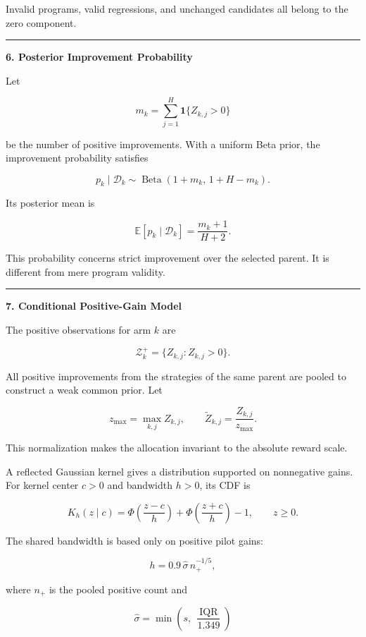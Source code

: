 \documentclass[
]{article}
\begin{document}
Invalid programs, valid regressions, and unchanged candidates all belong
to the zero component.

\begin{center}\rule{0.5\linewidth}{0.5pt}\end{center}

\textbf{6. Posterior Improvement Probability}

Let

\[
m_k=\sum_{j=1}^{H}\mathbf{1}\{Z_{k,j}>0\}
\]

be the number of positive improvements. With a uniform Beta prior, the
improvement probability satisfies

\[
p_k\mid\mathcal{D}_k
\sim
\operatorname{Beta}
\left(
1+m_k,\,
1+H-m_k
\right).
\]

Its posterior mean is

\[
\mathbb{E}[p_k\mid\mathcal{D}_k]
=
\frac{m_k+1}{H+2}.
\]

This probability concerns strict improvement over the selected parent.
It is different from mere program validity.

\begin{center}\rule{0.5\linewidth}{0.5pt}\end{center}

\textbf{7. Conditional Positive-Gain Model}

The positive observations for arm \(k\) are

\[
\mathcal{Z}_k^+
=
\{Z_{k,j}: Z_{k,j}>0\}.
\]

All positive improvements from the strategies of the same parent are
pooled to construct a weak common prior. Let

\[
z_{\max}
=
\max_{k,j} Z_{k,j},
\qquad
\widetilde Z_{k,j}
=
\frac{Z_{k,j}}{z_{\max}}.
\]

This normalization makes the allocation invariant to the absolute reward
scale.

A reflected Gaussian kernel gives a distribution supported on
nonnegative gains. For kernel center \(c>0\) and bandwidth \(h>0\), its
CDF is

\[
K_h(z\mid c)
=
\Phi\!\left(\frac{z-c}{h}\right)
+
\Phi\!\left(\frac{z+c}{h}\right)
-1,
\qquad z\ge 0.
\]

The shared bandwidth is based only on positive pilot gains:

\[
h
=
0.9\,\widehat{\sigma}\,n_+^{-1/5},
\]

where \(n_+\) is the pooled positive count and

\[
\widehat{\sigma}
=
\min\!\left(
s,\,
\frac{\operatorname{IQR}}{1.349}
\right)
\]
\end{document}

